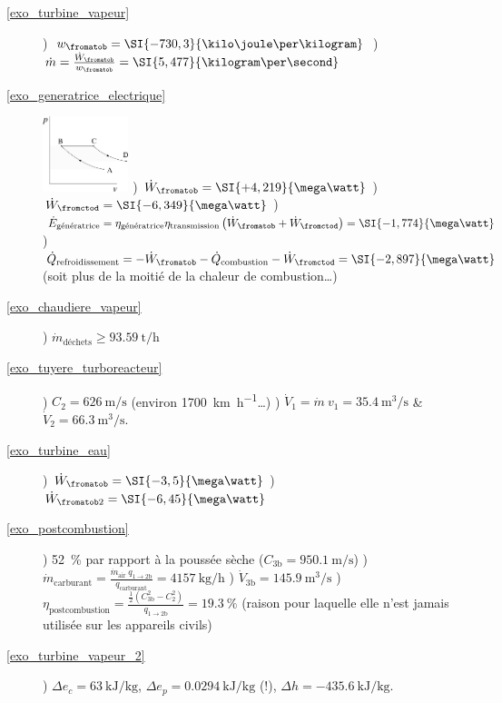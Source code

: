 	\begin{description}
		\item [\ref{exo_turbine_vapeur}] 
						) $w_\fromatob = \SI{-730,3}{\kilo\joule\per\kilogram}$
						) $\dot m = \frac{\dot{W}_\fromatob}{w_\fromatob} = \SI{5,477}{\kilogram\per\second}$
		\item [\ref{exo_generatrice_electrique}]
						\includegraphics[width=2.5cm]{images/exo_pv_1.png}
						) $\dot{W}_\fromatob = \SI{+4,219}{\mega\watt}$
						) $\dot{W}_\fromctod = \SI{-6,349}{\mega\watt}$
						) $\dot{E}_\text{génératrice} = \eta_\text{génératrice} \eta_\text{transmission} \left(\dot{W}_\fromatob + \dot{W}_\fromctod\right) = \SI{-1,774}{\mega\watt}$
						) $\dot{Q}_\text{refroidissement} = - \dot{W}_\fromatob - \dot{Q}_\text{combustion} - \dot{W}_\fromctod = \SI{-2,897}{\mega\watt}$ (soit plus de la moitié de la chaleur de combustion…)
		\item [\ref{exo_chaudiere_vapeur}] 
						) $\dot{m}_\text{déchets} \geq \SI{93,59}{\tonne\per\hour}$
		\item [\ref{exo_tuyere_turboreacteur}] 
						) $C_2 = \SI{626}{\metre\per\second}$ (environ \SI[per-mode=symbol]{1700}{\kilo\metre\per\hour}…)
						) $\dot{V}_1 = \dot m \ v_1 = \SI{35,4}{\metre\cubed\per\second}$ \& $\dot{V}_2 = \SI{66,3}{\metre\cubed\per\second}$.
		\item [\ref{exo_turbine_eau}]
						) $\dot{W}_\fromatob = \SI{-3,5}{\mega\watt}$
						) $\dot{W}_{\fromatob2} = \SI{-6,45}{\mega\watt}$
		\item [\ref{exo_postcombustion}] 
						) \SI{+52}{\percent} par rapport à la poussée sèche ($C_{3\text{b}} = \SI{950,1}{\metre\per\second}$)
						) $\dot{m}_\text{carburant} = \frac{\dot{m}_\text{air} \ q_{1\to 2\text{b}}}{q_\text{carburant}} = \SI[per-mode=symbol]{4157}{\kilogram\per\hour}$
						) $\dot{V}_{3\text{b}} = \SI{145,9}{\metre\cubed\per\second} $
						) $\eta_\text{postcombustion} = \frac{\frac{1}{2}\left(C_{3\text{b}}^2 - C_2^2\right)}{q_{1\to 2\text{b}}} =  \SI{19,3}{\percent}$ (raison pour laquelle elle n’est jamais utilisée sur les appareils civils)
		\item [\ref{exo_turbine_vapeur_2}]
						) $\Delta e_c = \SI{+63}{\kilo\joule\per\kilogram}$, $\Delta e_p = \SI{+0,0294}{\kilo\joule\per\kilogram}$ (!), $\Delta h = \SI{-435,6}{\kilo\joule\per\kilogram}$.

\end{description}
